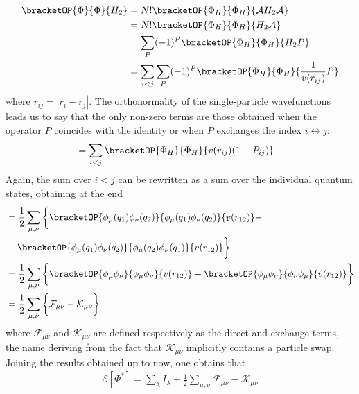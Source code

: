 \begin{align*}
    \bracketOP{\Phi}{\Phi}{H_2} &= N! \bracketOP{\Phi_H}{\Phi_H}{\mathcal{A}H_2 \mathcal{A}} \\
    &= N! \bracketOP{\Phi_H}{\Phi_H}{H_2 \mathcal{A}} \\
    &= \sum_P (-1)^P  \bracketOP{\Phi_H}{\Phi_H}{H_2 P} \\
    &= \sum_{i<j} \sum_P (-1)^P  \bracketOP{\Phi_H}{\Phi_H}{\frac{1}{v(r_{ij})} P}
\end{align*}
where $r_{ij}=|r_i -r_j|$. The orthonormality of the single-particle wavefunctions leads us to say that the only non-zero terms are those obtained when the operator $P$ coincides with the identity or when $P$ exchanges the index $i \leftrightarrow j$:   
\begin{align*}
    &= \sum_{i<j} \bracketOP{\Phi_H}{\Phi_H}{v(r_{ij})(1-P_{ij})}
\end{align*}
Again, the sum over $i<j$ can be rewritten as a sum over the individual quantum states, obtaining at the end
\begin{align*}
    &= \frac{1}{2} \sum_{\mu,\nu} \bigg\{ \bracketOP{\phi_\mu (q_1) \phi_\nu(q_2)}{\phi_\mu (q_1) \phi_\nu (q_2)}{v(r_{12})} - \\
    & - \bracketOP{\phi_\mu (q_1) \phi_\nu(q_2)}{\phi_\mu (q_2) \phi_\nu (q_1)}{v(r_{12})} \bigg\} \\
    &= \frac{1}{2} \sum_{\mu,\nu} \bigg\{ \bracketOP{\phi_\mu \phi_\nu}{\phi_\mu \phi_\nu }{v(r_{12})} - \bracketOP{\phi_\mu \phi_\nu}{\phi_\nu \phi_\mu }{v(r_{12})} \bigg\} \\
    &= \frac{1}{2} \sum_{\mu,\nu} \bigg\{ \mathcal{F}_{\mu\nu} - \mathcal{K}_{\mu\nu} \bigg\}
\end{align*}
where $\mathcal{F}_{\mu\nu}$ and $\mathcal{K}_{\mu\nu}$ are defined respectively as the direct and exchange terms, the name deriving from the fact that $\mathcal{K}_{\mu\nu}$ implicitly contains a particle swap. Joining the results obtained up to now, one obtains that
\begin{align*}
    \mathcal{E}[\Phi^*] = \sum_\lambda I_\lambda + \frac{1}{2} \sum_{\mu,\nu} \mathcal{F}_{\mu\nu} - \mathcal{K}_{\mu\nu}
\end{align*}

